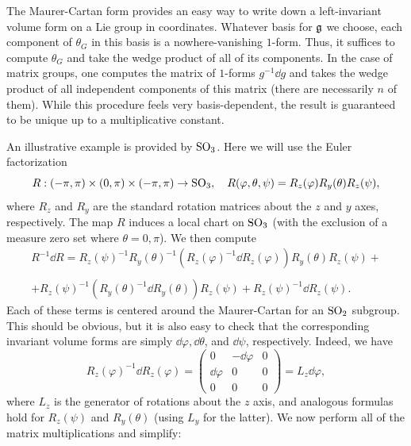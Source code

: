 \begin{rem}
    The Maurer-Cartan form provides an easy way to write down a left-invariant volume form on a Lie group in coordinates. Whatever basis for $\mathfrak{g}$ we choose, each component of $\theta_G$ in this basis is a nowhere-vanishing $1$-form. Thus, it suffices to compute $\theta_G$ and take the wedge product of all of its components. In the case of matrix groups, one computes the matrix of $1$-forms $g^{-1}\dd g$ and takes the wedge product of all independent components of this matrix (there are necessarily $n$ of them). While this procedure feels very basis-dependent, the result is guaranteed to be unique up to a multiplicative constant.
\end{rem}


\begin{example}
    An illustrative example is provided by $\operatorname{SO}_3$. Here we will use the Euler factorization
    \[R:(-\pi,\pi)\times(0,\pi)\times(-\pi,\pi)\to \operatorname{SO}_3,\quad R(\varphi,\theta,\psi)=R_z(\varphi)R_y(\theta)R_z(\psi),\]
    where $R_z$ and $R_y$ are the standard rotation matrices about the $z$ and $y$ axes, respectively. The map $R$ induces a local chart on $\operatorname{SO}_3$ (with the exclusion of a measure zero set where $\theta=0,\pi$). We then compute
    \begin{multline}
        R^{-1}\dd R=R_z(\psi)^{-1}R_y(\theta)^{-1}\left(R_z(\varphi)^{-1}\dd R_z(\varphi)\right)R_y(\theta)R_z(\psi)+\\
        \\+R_z(\psi)^{-1}\left(R_y(\theta)^{-1}\dd R_y(\theta)\right)R_z(\psi)+
        R_z(\psi)^{-1}\dd R_z(\psi).
    \end{multline}
    Each of these terms is centered around the Maurer-Cartan for an $\operatorname{SO}_2$ subgroup. This should be obvious, but it is also easy to check that the corresponding invariant volume forms are simply $\dd\varphi, \dd\theta$, and $\dd\psi$, respectively. Indeed, we have
    \[R_z(\varphi)^{-1}\dd R_z(\varphi)=\begin{pmatrix}
        0&-\dd\varphi&0\\
        \dd\varphi&0&0\\
        0&0&0
    \end{pmatrix}=L_z\dd\varphi,\]
    where $L_z$ is the generator of rotations about the $z$ axis, and  analogous formulas hold for $R_z(\psi)$ and $R_y(\theta)$ (using $L_y$ for the latter). We now perform all of the matrix multiplications and simplify:

\end{example}
